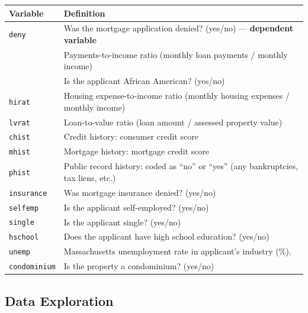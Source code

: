 \documentclass[
  12pt,
  letterpaper,
]{scrbook}
\theoremstyle{definition}
\theoremstyle{plain}
\theoremstyle{remark}
\begin{document}
\begin{longtable}[]{@{}
  >{\raggedright\arraybackslash}p{}
  >{\raggedright\arraybackslash}p{}@{}}
\toprule\noalign{}
\begin{minipage}[b]{\linewidth}\raggedright
Variable
\end{minipage} & \begin{minipage}[b]{\linewidth}\raggedright
Definition
\end{minipage} \\
\midrule\noalign{}
\endhead
\bottomrule\noalign{}
\endlastfoot
{\texttt{deny}} & Was the mortgage application denied? (yes/no) ---
\textbf{dependent variable} \\
{\texttt{pirat}} & Payments-to-income ratio (monthly loan payments /
monthly income) \\
{\texttt{afam}} & Is the applicant African American? (yes/no) \\
\texttt{hirat} & Housing expense-to-income ratio (monthly housing
expenses / monthly income) \\
\texttt{lvrat} & Loan-to-value ratio (loan amount / assessed property
value) \\
\texttt{chist} & Credit history: consumer credit score \\
\texttt{mhist} & Mortgage history: mortgage credit score \\
\texttt{phist} & Public record history: coded as ``no'' or ``yes'' (any
bankruptcies, tax liens, etc.) \\
\texttt{insurance} & Was mortgage insurance denied? (yes/no) \\
\texttt{selfemp} & Is the applicant self-employed? (yes/no) \\
\texttt{single} & Is the applicant single? (yes/no) \\
\texttt{hschool} & Does the applicant have high school education?
(yes/no) \\
\texttt{unemp} & 1989 Massachusetts unemployment rate in applicant's
industry (\%). \\
\texttt{condominium} & Is the property a condominium? (yes/no) \\
\end{longtable}

\subsection{Data Exploration}\label{data-exploration}
\end{document}
